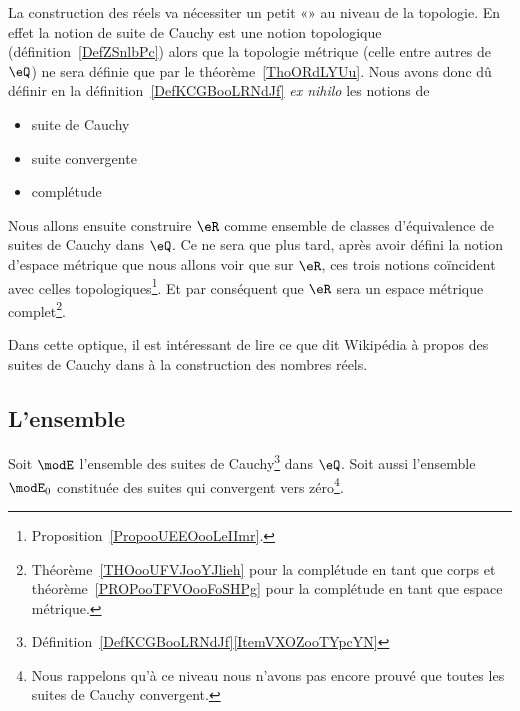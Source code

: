 \begin{normaltext}      \label{NormooHRDZooRGGtCd}
    La construction des réels va nécessiter un petit «» au niveau de la topologie. En effet la notion de suite de Cauchy est une notion topologique (définition~\ref{DefZSnlbPc}) alors que la topologie métrique (celle entre autres de \( \eQ\)) ne sera définie que par le théorème~\ref{ThoORdLYUu}. Nous avons donc dû définir en la définition~\ref{DefKCGBooLRNdJf} \emph{ex nihilo} les notions de
\begin{itemize}
    \item
        suite de Cauchy
    \item
        suite convergente
    \item
        complétude
\end{itemize}
Nous allons ensuite construire \( \eR\) comme ensemble de classes d'équivalence de suites de Cauchy dans \( \eQ\). Ce ne sera que plus tard, après avoir défini la notion d'espace métrique que nous allons voir que sur \( \eR\), ces trois notions coïncident avec celles topologiques\footnote{Proposition~\ref{PropooUEEOooLeIImr}.}. Et par conséquent que \( \eR\) sera un espace métrique complet\footnote{Théorème~\ref{THOooUFVJooYJlieh} pour la complétude en tant que corps et théorème~\ref{PROPooTFVOooFoSHPg} pour la complétude en tant que espace métrique.}.

Dans cette optique, il est intéressant de lire ce que dit Wikipédia à propos des suites de Cauchy dans  à la construction des nombres réels.
\end{normaltext}

\subsection{L'ensemble}

Soit \( \modE\) l'ensemble des suites de Cauchy\footnote{Définition~\ref{DefKCGBooLRNdJf}\ref{ItemVXOZooTYpcYN}} dans \( \eQ\). Soit aussi l'ensemble \( \modE_0\) constituée des suites qui convergent vers zéro\footnote{Nous rappelons qu'à ce niveau nous n'avons pas encore prouvé que toutes les suites de Cauchy convergent.}.

